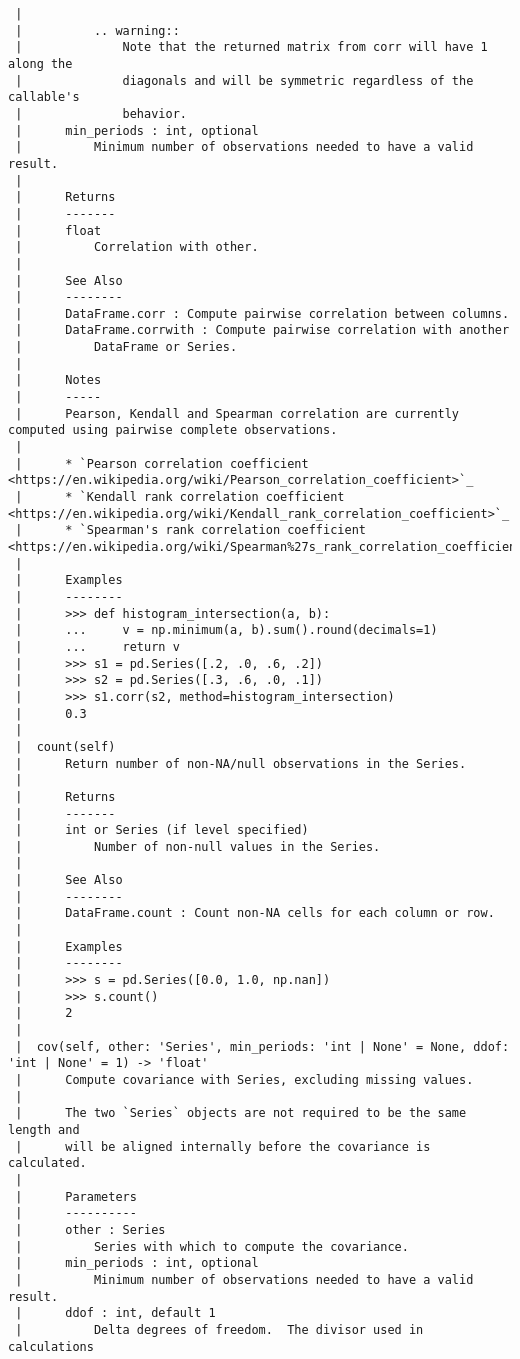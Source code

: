 \documentclass[
  letterpaper,
  DIV=11,
  numbers=noendperiod]{scrreprt}
\begin{document}
\begin{verbatim}
 |      
 |          .. warning::
 |              Note that the returned matrix from corr will have 1 along the
 |              diagonals and will be symmetric regardless of the callable's
 |              behavior.
 |      min_periods : int, optional
 |          Minimum number of observations needed to have a valid result.
 |      
 |      Returns
 |      -------
 |      float
 |          Correlation with other.
 |      
 |      See Also
 |      --------
 |      DataFrame.corr : Compute pairwise correlation between columns.
 |      DataFrame.corrwith : Compute pairwise correlation with another
 |          DataFrame or Series.
 |      
 |      Notes
 |      -----
 |      Pearson, Kendall and Spearman correlation are currently computed using pairwise complete observations.
 |      
 |      * `Pearson correlation coefficient <https://en.wikipedia.org/wiki/Pearson_correlation_coefficient>`_
 |      * `Kendall rank correlation coefficient <https://en.wikipedia.org/wiki/Kendall_rank_correlation_coefficient>`_
 |      * `Spearman's rank correlation coefficient <https://en.wikipedia.org/wiki/Spearman%27s_rank_correlation_coefficient>`_
 |      
 |      Examples
 |      --------
 |      >>> def histogram_intersection(a, b):
 |      ...     v = np.minimum(a, b).sum().round(decimals=1)
 |      ...     return v
 |      >>> s1 = pd.Series([.2, .0, .6, .2])
 |      >>> s2 = pd.Series([.3, .6, .0, .1])
 |      >>> s1.corr(s2, method=histogram_intersection)
 |      0.3
 |  
 |  count(self)
 |      Return number of non-NA/null observations in the Series.
 |      
 |      Returns
 |      -------
 |      int or Series (if level specified)
 |          Number of non-null values in the Series.
 |      
 |      See Also
 |      --------
 |      DataFrame.count : Count non-NA cells for each column or row.
 |      
 |      Examples
 |      --------
 |      >>> s = pd.Series([0.0, 1.0, np.nan])
 |      >>> s.count()
 |      2
 |  
 |  cov(self, other: 'Series', min_periods: 'int | None' = None, ddof: 'int | None' = 1) -> 'float'
 |      Compute covariance with Series, excluding missing values.
 |      
 |      The two `Series` objects are not required to be the same length and
 |      will be aligned internally before the covariance is calculated.
 |      
 |      Parameters
 |      ----------
 |      other : Series
 |          Series with which to compute the covariance.
 |      min_periods : int, optional
 |          Minimum number of observations needed to have a valid result.
 |      ddof : int, default 1
 |          Delta degrees of freedom.  The divisor used in calculations

\end{verbatim}
\end{document}
